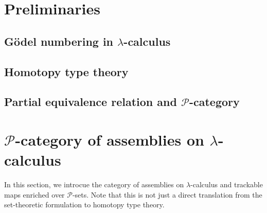 \documentclass[a4paper,UKenglish,numberwithinsect,cleveref,thm-restate]{lipics-v2021}
\newcommand{\PP}{\mathscr{P}}
\theoremstyle{plain}
\begin{document}
\section{Preliminaries}\label{sec:preliminaries}

\subsection{Gödel numbering in \texorpdfstring{$\lambda$}{λ}-calculus}
\subsection{Homotopy type theory}
\subsection{Partial equivalence relation and \texorpdfstring{$\PP$}{P}-category}

\section{\texorpdfstring{$\PP$}{P}-category of assemblies on \texorpdfstring{$\lambda$}{λ}-calculus}\label{sec:assemblies}
In this section, we introcue the category of assemblies on $\lambda$-calculus and trackable maps enriched over $\PP$-sets.
Note that this is not just a direct translation from the set-theoretic formulation to homotopy type theory.
\end{document}
